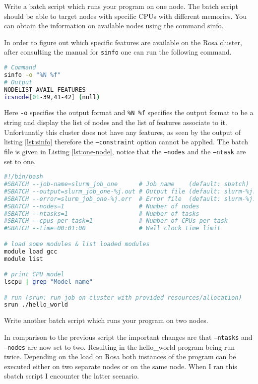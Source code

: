 \begin{question}  \label{q:1-4}
Write a batch script which runs your program on one node. The batch script should be able to target nodes with specific CPUs with different memories. You can obtain the information on available nodes using the command sinfo. 
\end{question}
In order to figure out which specific features are available on the Rosa cluster, after consulting the manual for \texttt{sinfo} \cite{noauthor_slurm_nodate-1} one can run the following command.
\begin{lstlisting}[language=bash, label=lst:sinfo, caption=Detecting features on Rosa] 
# Command
sinfo -o "%N %f"
# Output
NODELIST AVAIL_FEATURES
icsnode[01-39,41-42] (null)
\end{lstlisting}
Here \texttt{-o} specifies the output format and \texttt{\%N \%f} specifies the output format to be a string and display the list of nodes and the list of features associate to it. Unfortunatly this cluster does not have any features, as seen by the output of listing \ref{lst:sinfo} therefore the \texttt{--constraint} option cannot be applied. The batch file is given in Listing \ref{lst:one-node}, notice that the \texttt{--nodes} and the \texttt{--ntask} are set to one.

\begin{lstlisting}[language=bash, caption=single node sbatch script, label=lst:one-node]
#!/bin/bash
#SBATCH --job-name=slurm_job_one      # Job name    (default: sbatch)
#SBATCH --output=slurm_job_one-%j.out # Output file (default: slurm-%j.out)
#SBATCH --error=slurm_job_one-%j.err  # Error file  (default: slurm-%j.out)
#SBATCH --nodes=1                     # Number of nodes
#SBATCH --ntasks=1                    # Number of tasks
#SBATCH --cpus-per-task=1             # Number of CPUs per task
#SBATCH --time=00:01:00               # Wall clock time limit

# load some modules & list loaded modules
module load gcc
module list

# print CPU model
lscpu | grep "Model name"

# run (srun: run job on cluster with provided resources/allocation)
srun ./hello_world
\end{lstlisting}
\begin{question}
	Write another batch script which runs your program on two nodes.
\end{question}
In comparison to the previous script the important changes are that \texttt{--ntasks} and \texttt{--nodes} are now set to two. Resulting in the hello\_world program being run twice.
Depending on the load on Rosa both instances of the program can be executed either on two separate nodes or on the same node. When I ran this sbatch script I encounter the latter scenario.

